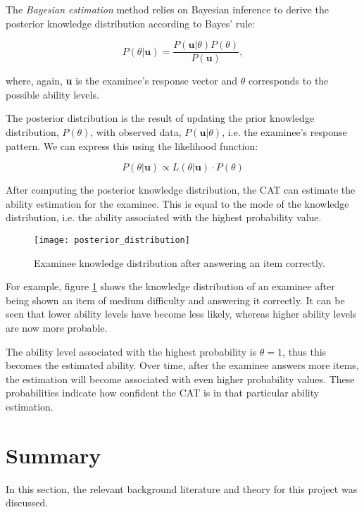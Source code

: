 The \textit{Bayesian estimation} method relies on Bayesian inference to derive the posterior knowledge distribution according to Bayes' rule:

$$P(\theta | \textbf{u}) = \dfrac{P(\textbf{u} | \theta)P(\theta)}{P(\textbf{u})} ,$$

where, again, \textbf{u} is the examinee's response vector and $\theta$ corresponds to the possible ability levels.\newline

The posterior distribution is the result of updating the prior knowledge distribution, $P(\theta)$, with observed data, $P(\textbf{u} | \theta)$, i.e. the examinee's response pattern. We can express this using the likelihood function:

$$P(\theta | \textbf{u}) \propto L(\theta | \textbf{u}) \cdot P(\theta)$$

After computing the posterior knowledge distribution, the CAT can estimate the ability estimation for the examinee. This is equal to the mode of the knowledge distribution, i.e. the ability associated with the highest probability value.

\begin{figure}[H]
\centering
\texttt{[image: posterior\_distribution]}
\caption{Examinee knowledge distribution after answering an item correctly.}
\label{fig:posterior_distribution}
\end{figure}

For example, figure \ref{fig:posterior_distribution} shows the knowledge distribution of an examinee after being shown an item of medium difficulty and answering it correctly. It can be seen that lower ability levels have become less likely, whereas higher ability levels are now more probable.\newline

The ability level associated with the highest probability is $\theta=1$, thus this becomes the estimated ability. Over time, after the examinee answers more items, the estimation will become associated with even higher probability values. These probabilities indicate how confident the CAT is in that particular ability estimation.

\section{Summary}
In this section, the relevant background literature and theory for this project was discussed.\newline

